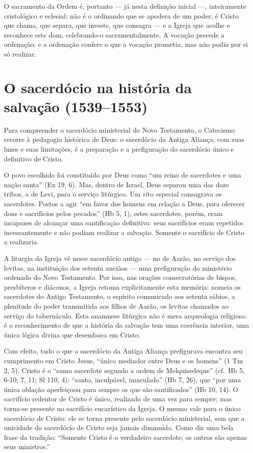 O sacramento da Ordem é, portanto --- já nesta definição inicial ---, inteiramente cristológico e eclesial: não é o ordinando que se apodera de um poder; é Cristo que chama, que separa, que investe, que consagra --- e a Igreja que acolhe e reconhece este dom, celebrando-o sacramentalmente. A vocação precede a ordenação; e a ordenação confere o que a vocação prometia, mas não podia por si só realizar.

\section{O sacerdócio na história da salvação (1539--1553)}

Para compreender o sacerdócio ministerial do Novo Testamento, o Catecismo recorre à pedagogia histórica de Deus: o sacerdócio da Antiga Aliança, com suas luzes e suas limitações, é a preparação e a prefiguração do sacerdócio único e definitivo de Cristo.

O povo escolhido foi constituído por Deus como ``um reino de sacerdotes e uma nação santa'' (Ex 19, 6). Mas, dentro de Israel, Deus separou uma das doze tribos, a de Levi, para o serviço litúrgico. Um rito especial consagrava os sacerdotes. Postos a agir ``em favor dos homens em relação a Deus, para oferecer dons e sacrifícios pelos pecados'' (Hb 5, 1), estes sacerdotes, porém, eram incapazes de alcançar uma santificação definitiva: seus sacrifícios eram repetidos incessantemente e não podiam realizar a salvação. Somente o sacrifício de Cristo a realizaria.

A liturgia da Igreja vê nesse sacerdócio antigo --- no de Aarão, no serviço dos levitas, na instituição dos setenta anciãos --- uma prefiguração do ministério ordenado do Novo Testamento. Por isso, nas orações consecratórias de bispos, presbíteros e diáconos, a Igreja retoma explicitamente esta memória: nomeia os sacerdotes do Antigo Testamento, o espírito comunicado aos setenta sábios, a plenitude do poder transmitida aos filhos de Aarão, os levitas chamados ao serviço do tabernáculo. Esta anamnese litúrgica não é mera arqueologia religiosa: é o reconhecimento de que a história da salvação tem uma coerência interior, uma única lógica divina que desemboca em Cristo.

Com efeito, tudo o que o sacerdócio da Antiga Aliança prefigurava encontra seu cumprimento em Cristo Jesus, ``único mediador entre Deus e os homens'' (1 Tm 2, 5). Cristo é o ``sumo sacerdote segundo a ordem de Melquisedeque'' (cf.~Hb 5, 6-10; 7, 11; Sl 110, 4): ``santo, inculpável, imaculado'' (Hb 7, 26), que ``por uma única oblação aperfeiçoou para sempre os que são santificados'' (Hb 10, 14). O sacrifício redentor de Cristo é único, realizado de uma vez para sempre; mas torna-se presente no sacrifício eucarístico da Igreja. O mesmo vale para o único sacerdócio de Cristo: ele se torna presente pelo sacerdócio ministerial, sem que a unicidade do sacerdócio de Cristo seja jamais diminuída. Como diz uma bela frase da tradição: ``Somente Cristo é o verdadeiro sacerdote; os outros são apenas seus ministros.''

